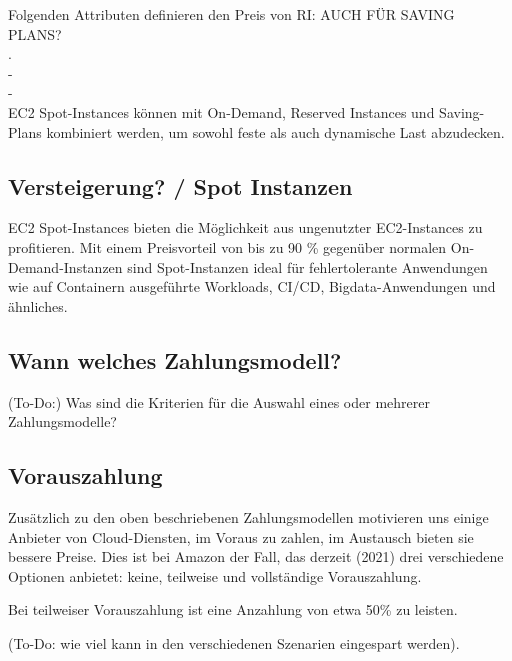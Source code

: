 Folgenden Attributen definieren den Preis von RI:
AUCH FÜR SAVING PLANS?
\\
.
\\
-
\\
-
\\

EC2 Spot-Instances können mit On-Demand, Reserved Instances und Saving-Plans kombiniert werden, um sowohl feste als auch dynamische Last abzudecken.

    {\cite{AMZ07}}

\subsection{Versteigerung? / Spot Instanzen }
EC2 Spot-Instances bieten die Möglichkeit aus ungenutzter EC2-Instances zu profitieren.
Mit einem Preisvorteil von bis zu 90 \% gegenüber normalen On-Demand-Instanzen sind Spot-Instanzen ideal für fehlertolerante Anwendungen wie auf Containern ausgeführte Workloads, CI/CD, Bigdata-Anwendungen und ähnliches.
\subsection{Wann welches Zahlungsmodell?}
(To-Do:) Was sind die Kriterien für die Auswahl eines oder mehrerer Zahlungsmodelle?



\subsection{Vorauszahlung}
Zusätzlich zu den oben beschriebenen Zahlungsmodellen motivieren uns einige Anbieter von Cloud-Diensten, im Voraus zu zahlen, im Austausch bieten sie bessere Preise. Dies ist bei Amazon der Fall, das derzeit (2021) drei verschiedene Optionen anbietet: keine, teilweise und vollständige Vorauszahlung.

Bei teilweiser Vorauszahlung ist eine Anzahlung von etwa 50\% zu leisten.

(To-Do: wie viel kann in den verschiedenen Szenarien eingespart werden).